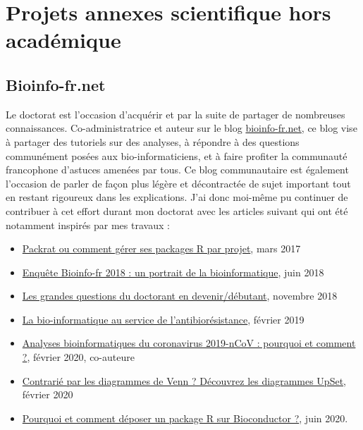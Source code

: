 \chapter{Projets annexes scientifique hors académique}
\label{annexe_projets_annexe}

\section{Bioinfo-fr.net}

Le doctorat est l'occasion d'acquérir et par la suite de partager de nombreuses connaissances. Co-administratrice et auteur sur le blog \href{https://bioinfo-fr.net/}{bioinfo-fr.net}, ce blog vise à partager des tutoriels sur des analyses, à répondre à des questions communément posées aux bio-informaticiens, et à faire profiter la communauté francophone d'astuces amenées par tous. Ce blog communautaire est également l'occasion de parler de façon plus légère et décontractée de sujet important tout en restant rigoureux dans les explications. J'ai donc moi-même pu continuer de contribuer à cet effort durant mon doctorat avec les articles suivant qui ont été notamment inspirés par mes travaux :

\begin{itemize}
    \item \href{https://bioinfo-fr.net/packrat-ou-comment-gerer-ses-packages-r-par-projet}{Packrat ou comment gérer ses packages R par projet}, mars 2017
    \item \href{https://bioinfo-fr.net/enquete-bioinfo-fr-2018-portrait-de-bioinfo}{Enquête Bioinfo-fr 2018 : un portrait de la bioinformatique}, juin 2018
    \item \href{https://bioinfo-fr.net/grandes-questions-doctorant-debutant}{Les grandes questions du doctorant en devenir/débutant}, novembre 2018
    \item \href{https://bioinfo-fr.net/la-resistance-aux-antibiotiques-vu-cote-bioinfo}{La bio-informatique au service de l’antibiorésistance}, février 2019
    \item \href{https://bioinfo-fr.net/analyses-bioinformatiques-du-coronavirus-2019-ncov-pourquoi-et-comment}{Analyses bioinformatiques du coronavirus 2019-nCoV : pourquoi et comment ?}, février 2020, co-auteure
    \item \href{https://bioinfo-fr.net/contrarie-par-les-diagrammes-de-venn-decouvrez-les-diagrammes-upset}{Contrarié par les diagrammes de Venn ? Découvrez les diagrammes UpSet}, février 2020
    \item \href{https://bioinfo-fr.net/pourquoi-et-comment-deposer-un-package-r-sur-bioconductor}{Pourquoi et comment déposer un package R sur Bioconductor ?}, juin 2020.
\end{itemize}

